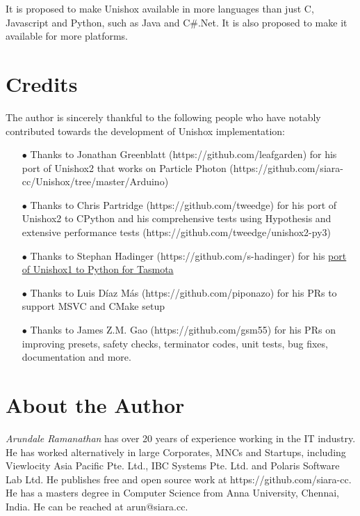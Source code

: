 \documentclass[]{article}
\begin{document}
	It is proposed to make Unishox available in more languages than just C, Javascript and Python, such as Java and C\#.Net. It is also proposed to make it available for more platforms.
	
	\section{Credits}
	
	The author is sincerely thankful to the following people who have notably contributed towards the development of Unishox implementation:
	
	\begin{itemize}
		\item[$\bullet$] Thanks to Jonathan Greenblatt (https://github.com/leafgarden) for his port of Unishox2 that works on Particle Photon (https://github.com/siara-cc/Unishox/tree/master/Arduino)
		\item[$\bullet$] Thanks to Chris Partridge (https://github.com/tweedge) for his port of Unishox2 to CPython and his comprehensive tests using Hypothesis and extensive performance tests (https://github.com/tweedge/unishox2-py3)
		\item[$\bullet$] Thanks to Stephan Hadinger (https://github.com/s-hadinger) for his \href{https://github.com/arendst/Tasmota/tree/development/tools/unishox}{port of Unishox1 to Python for Tasmota}
		\item[$\bullet$] Thanks to Luis Díaz Más (https://github.com/piponazo) for his PRs to support MSVC and CMake setup
		\item[$\bullet$] Thanks to James Z.M. Gao (https://github.com/gsm55) for his PRs on improving presets, safety checks, terminator codes, unit tests, bug fixes, documentation and more.
	\end{itemize}
	
	\section{About the Author}
	
	\emph{Arundale Ramanathan} has over 20 years of experience working in the IT industry. He has worked alternatively in large Corporates, MNCs and Startups, including Viewlocity Asia Pacific Pte. Ltd., IBC Systems Pte. Ltd. and Polaris Software Lab Ltd. He publishes free and open source work at https://github.com/siara-cc. He has a masters degree in Computer Science from Anna University, Chennai, India. He can be reached at arun@siara.cc.
	
\end{document}
